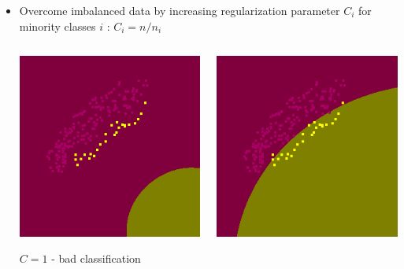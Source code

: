 \documentclass[c]{beamer}
\begin{document}
\begin{frame}
\begin{itemize}
\item Overcome imbalanced data by increasing regularization parameter $C_{i}$ for minority classes $i$ :  $C_{i} = n/n_{i}$

\begin{columns}
 \begin{column}{0.35\textwidth}
  \begin{overlayarea}{\linewidth}{2cm}
    \centering\vfill
     \includegraphics[scale=0.17]{../4_classification/images/svm/svm_g_1_1.png}
  \end{overlayarea}
  \begin{overlayarea}{\linewidth}{0.5cm}
    \centering
    \tiny $C=1$ - bad classification\par
  \end{overlayarea}
 \end{column}
 \begin{column}{0.35\textwidth}
  \begin{overlayarea}{\linewidth}{2cm}
    \centering\vfill
    \includegraphics[scale=0.17]{../4_classification/images/svm/svm_g_1_10.png}

\end{overlayarea}
\end{column}
\end{columns}
\end{itemize}
\end{frame}
\end{document}
